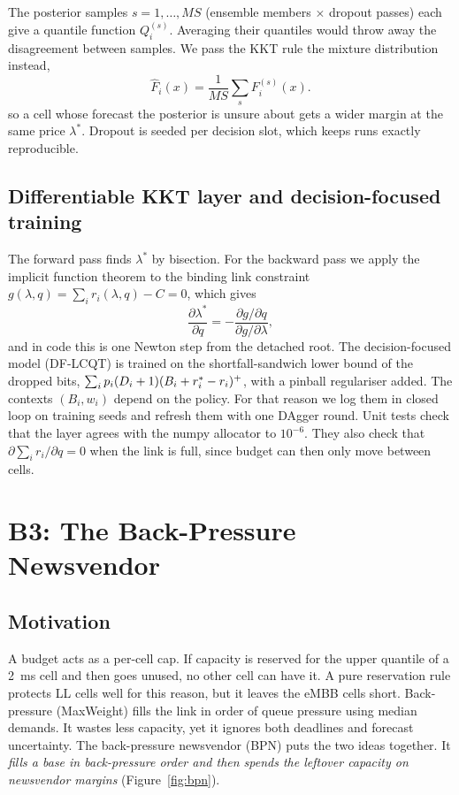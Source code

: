 The posterior samples $s = 1,\dots,MS$ (ensemble members $\times$ dropout passes) each give a quantile function $Q_i^{(s)}$. Averaging their quantiles would throw away the disagreement between samples. We pass the KKT rule the mixture distribution instead,
\begin{equation}
  \hat F_i(x) = \frac{1}{MS}\sum_s F_i^{(s)}(x).
\end{equation}
so a cell whose forecast the posterior is unsure about gets a wider margin at the same price $\lambda^\ast$. Dropout is seeded per decision slot, which keeps runs exactly reproducible.

\subsection{Differentiable KKT layer and decision-focused training}

The forward pass finds $\lambda^\ast$ by bisection. For the backward pass we apply the implicit function theorem to the binding link constraint $g(\lambda,q) = \sum_i r_i(\lambda,q) - C = 0$, which gives
\begin{equation}
  \frac{\partial\lambda^\ast}{\partial q} = -\frac{\partial g/\partial q}{\partial g/\partial \lambda},
\end{equation}
and in code this is one Newton step from the detached root. The decision-focused model (DF-LCQT) is trained on the shortfall-sandwich lower bound of the dropped bits, $\sum_i p_i (D_i+1)(B_i + r^{\ast}_i - r_i)^+$, with a pinball regulariser added. The contexts $(B_i, w_i)$ depend on the policy. For that reason we log them in closed loop on training seeds and refresh them with one DAgger round. Unit tests check that the layer agrees with the numpy allocator to $10^{-6}$. They also check that $\partial \sum_i r_i / \partial q = 0$ when the link is full, since budget can then only move between cells.

\section{B3: The Back-Pressure Newsvendor}
\label{sec:bpn}

\subsection{Motivation}

A budget acts as a per-cell cap. If capacity is reserved for the upper quantile of a 2~ms cell and then goes unused, no other cell can have it. A pure reservation rule protects LL cells well for this reason, but it leaves the eMBB cells short. Back-pressure (MaxWeight) fills the link in order of queue pressure using median demands. It wastes less capacity, yet it ignores both deadlines and forecast uncertainty. The back-pressure newsvendor (BPN) puts the two ideas together. It \emph{fills a base in back-pressure order and then spends the leftover capacity on newsvendor margins} (Figure~\ref{fig:bpn}).


